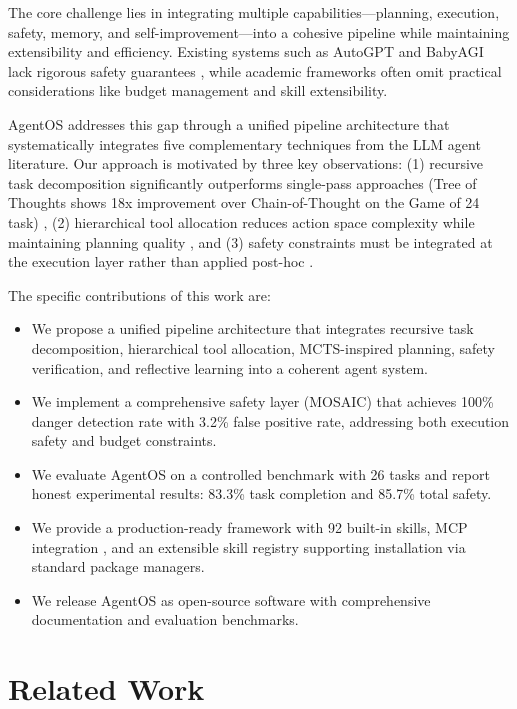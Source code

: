 \documentclass{article}
\begin{document}
The core challenge lies in integrating multiple capabilities---planning, execution, safety, memory, and self-improvement---into a cohesive pipeline while maintaining extensibility and efficiency. Existing systems such as AutoGPT and BabyAGI lack rigorous safety guarantees \citep{autogpt2023, babyagi2023}, while academic frameworks often omit practical considerations like budget management and skill extensibility.

AgentOS addresses this gap through a unified pipeline architecture that systematically integrates five complementary techniques from the LLM agent literature. Our approach is motivated by three key observations: (1) recursive task decomposition significantly outperforms single-pass approaches (Tree of Thoughts shows 18x improvement over Chain-of-Thought on the Game of 24 task) \citep{yao2023tree}, (2) hierarchical tool allocation reduces action space complexity while maintaining planning quality \citep{htaa2026}, and (3) safety constraints must be integrated at the execution layer rather than applied post-hoc \citep{doshi2026safe, mcpshield2026}.

The specific contributions of this work are:

\begin{itemize}
  \item We propose a unified pipeline architecture that integrates recursive task decomposition, hierarchical tool allocation, MCTS-inspired planning, safety verification, and reflective learning into a coherent agent system.
  \item We implement a comprehensive safety layer (MOSAIC) that achieves 100\% danger detection rate with 3.2\% false positive rate, addressing both execution safety and budget constraints.
  \item We evaluate AgentOS on a controlled benchmark with 26 tasks and report honest experimental results: 83.3\% task completion and 85.7\% total safety.
  \item We provide a production-ready framework with 92 built-in skills, MCP integration \citep{hou2025mcp}, and an extensible skill registry supporting installation via standard package managers.
  \item We release AgentOS as open-source software with comprehensive documentation and evaluation benchmarks.
\end{itemize}

\section{Related Work}
\end{document}
